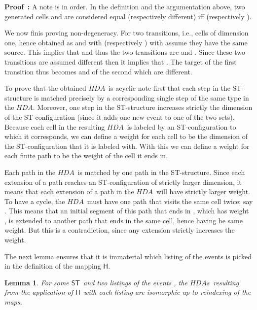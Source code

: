 \documentclass[submission,copyright,creativecommons]{eptcs}
\newtheorem{lemma}[theorem]{Lemma}
\newenvironment{proof}[1][\!\!\,]{\vspace{1ex}\noindent\textbf{Proof #1: }}{\hfill\vspace{2ex}}
\newcommand\HDA{\ensuremath{\mathit{HDA}}}
\newcommand\HDAs{\ensuremath{\mathit{HDAs}}}
\newcommand\ST{\ensuremath{\mathsf{ST}}}
\newcommand\stintoh{\ensuremath{\mathsf{H}}}
\begin{document}
\begin{proof}
A note is in order. In the definition and the argumentation above, two generated cells  and  are considered equal (respectively different) iff  (respectively ).

We now finis proving non-degeneracy. For two transitions, i.e., cells of dimension one, hence obtained as  and  with  (respectively ) with  assume they have the same source. This implies that  and thus the two transitions are  and . Since these two transitions are assumed different then it implies that . The target of the first transition thus becomes  and of the second  which are different.

To prove that the obtained \HDA\ is acyclic note first that each step in the ST-structure is matched precisely by a corresponding single step of the same type in the \HDA. Moreover, one step in the ST-structure increases strictly the dimension of the ST-configuration (since it adds one new event to one of the two sets).
Because each cell in the resulting \HDA\ is labeled by an ST-configuration to which it corresponds, we can define a weight for each cell to be the dimension of the ST-configuration that it is labeled with. With this we can define a weight for each finite path to be the weight of the cell it ends in.

Each path in the \HDA\ is matched by one path in the ST-structure. Since each extension of a path reaches an ST-configuration of strictly larger dimension, it means that each extension of a path in the \HDA\ will have strictly larger weight. To have a cycle, the \HDA\ must have one path that visits the same cell twice; say . This means that an initial segment of this path that ends in , which has weight , is extended to another path that ends in the same cell, hence having he same weight. But this is a contradiction, since any extension strictly increases the weight.
\vspace{1ex}
\end{proof}

The next lemma ensures that it is immaterial which listing of the events is picked in the definition of the mapping \stintoh.

\begin{lemma}\label{lemma_listings_different}
For some \ST\ and two listings  of the events , the \HDAs\ resulting from the application of \stintoh\ with each listing are isomorphic up to reindexing of the maps.
\end{lemma}
\end{document}
